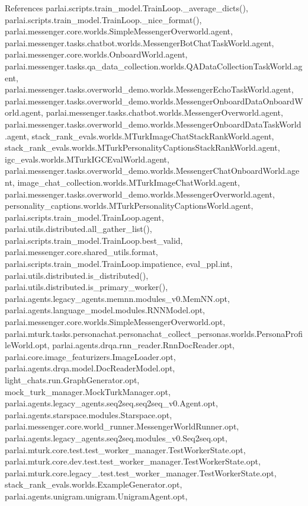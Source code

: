 References parlai.\+scripts.\+train\+\_\+model.\+Train\+Loop.\+\_\+average\+\_\+dicts(), parlai.\+scripts.\+train\+\_\+model.\+Train\+Loop.\+\_\+nice\+\_\+format(), parlai.\+messenger.\+core.\+worlds.\+Simple\+Messenger\+Overworld.\+agent, parlai.\+messenger.\+tasks.\+chatbot.\+worlds.\+Messenger\+Bot\+Chat\+Task\+World.\+agent, parlai.\+messenger.\+core.\+worlds.\+Onboard\+World.\+agent, parlai.\+messenger.\+tasks.\+qa\+\_\+data\+\_\+collection.\+worlds.\+Q\+A\+Data\+Collection\+Task\+World.\+agent, parlai.\+messenger.\+tasks.\+overworld\+\_\+demo.\+worlds.\+Messenger\+Echo\+Task\+World.\+agent, parlai.\+messenger.\+tasks.\+overworld\+\_\+demo.\+worlds.\+Messenger\+Onboard\+Data\+Onboard\+World.\+agent, parlai.\+messenger.\+tasks.\+chatbot.\+worlds.\+Messenger\+Overworld.\+agent, parlai.\+messenger.\+tasks.\+overworld\+\_\+demo.\+worlds.\+Messenger\+Onboard\+Data\+Task\+World.\+agent, stack\+\_\+rank\+\_\+evals.\+worlds.\+M\+Turk\+Image\+Chat\+Stack\+Rank\+World.\+agent, stack\+\_\+rank\+\_\+evals.\+worlds.\+M\+Turk\+Personality\+Captions\+Stack\+Rank\+World.\+agent, igc\+\_\+evals.\+worlds.\+M\+Turk\+I\+G\+C\+Eval\+World.\+agent, parlai.\+messenger.\+tasks.\+overworld\+\_\+demo.\+worlds.\+Messenger\+Chat\+Onboard\+World.\+agent, image\+\_\+chat\+\_\+collection.\+worlds.\+M\+Turk\+Image\+Chat\+World.\+agent, parlai.\+messenger.\+tasks.\+overworld\+\_\+demo.\+worlds.\+Messenger\+Overworld.\+agent, personality\+\_\+captions.\+worlds.\+M\+Turk\+Personality\+Captions\+World.\+agent, parlai.\+scripts.\+train\+\_\+model.\+Train\+Loop.\+agent, parlai.\+utils.\+distributed.\+all\+\_\+gather\+\_\+list(), parlai.\+scripts.\+train\+\_\+model.\+Train\+Loop.\+best\+\_\+valid, parlai.\+messenger.\+core.\+shared\+\_\+utils.\+format, parlai.\+scripts.\+train\+\_\+model.\+Train\+Loop.\+impatience, eval\+\_\+ppl.\+int, parlai.\+utils.\+distributed.\+is\+\_\+distributed(), parlai.\+utils.\+distributed.\+is\+\_\+primary\+\_\+worker(), parlai.\+agents.\+legacy\+\_\+agents.\+memnn.\+modules\+\_\+v0.\+Mem\+N\+N.\+opt, parlai.\+agents.\+language\+\_\+model.\+modules.\+R\+N\+N\+Model.\+opt, parlai.\+messenger.\+core.\+worlds.\+Simple\+Messenger\+Overworld.\+opt, parlai.\+mturk.\+tasks.\+personachat.\+personachat\+\_\+collect\+\_\+personas.\+worlds.\+Persona\+Profile\+World.\+opt, parlai.\+agents.\+drqa.\+rnn\+\_\+reader.\+Rnn\+Doc\+Reader.\+opt, parlai.\+core.\+image\+\_\+featurizers.\+Image\+Loader.\+opt, parlai.\+agents.\+drqa.\+model.\+Doc\+Reader\+Model.\+opt, light\+\_\+chats.\+run.\+Graph\+Generator.\+opt, mock\+\_\+turk\+\_\+manager.\+Mock\+Turk\+Manager.\+opt, parlai.\+agents.\+legacy\+\_\+agents.\+seq2seq.\+seq2seq\+\_\+v0.\+Agent.\+opt, parlai.\+agents.\+starspace.\+modules.\+Starspace.\+opt, parlai.\+messenger.\+core.\+world\+\_\+runner.\+Messenger\+World\+Runner.\+opt, parlai.\+agents.\+legacy\+\_\+agents.\+seq2seq.\+modules\+\_\+v0.\+Seq2seq.\+opt, parlai.\+mturk.\+core.\+test.\+test\+\_\+worker\+\_\+manager.\+Test\+Worker\+State.\+opt, parlai.\+mturk.\+core.\+dev.\+test.\+test\+\_\+worker\+\_\+manager.\+Test\+Worker\+State.\+opt, parlai.\+mturk.\+core.\+legacy\+\_.\+test.\+test\+\_\+worker\+\_\+manager.\+Test\+Worker\+State.\+opt, stack\+\_\+rank\+\_\+evals.\+worlds.\+Example\+Generator.\+opt, parlai.\+agents.\+unigram.\+unigram.\+Unigram\+Agent.\+opt, 